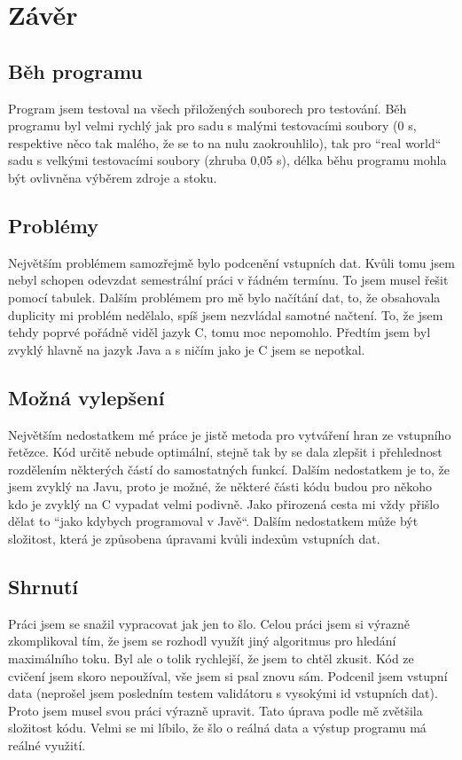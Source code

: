 \documentclass[12pt,a4paper]{article}
\begin{document}
	 \section{Závěr}
	 \subsection{Běh programu}
	 Program jsem testoval na všech přiložených souborech pro testování. Běh programu byl velmi rychlý jak pro sadu s malými testovacími soubory (0 s, respektive něco tak malého, že se to na nulu zaokrouhlilo), tak pro “real world“ sadu s velkými testovacími soubory (zhruba 0,05 s), délka běhu programu mohla být ovlivněna výběrem zdroje a stoku.
	 \subsection{Problémy}
	 Největším problémem samozřejmě bylo podcenění vstupních dat. Kvůli tomu jsem nebyl schopen odevzdat semestrální práci v řádném termínu. To jsem musel řešit pomocí tabulek. Dalším problémem pro mě bylo načítání dat, to, že obsahovala duplicity mi problém nedělalo, spíš jsem nezvládal samotné načtení. To, že jsem tehdy poprvé pořádně viděl jazyk C, tomu moc nepomohlo. Předtím jsem byl zvyklý hlavně na jazyk Java a s ničím jako je C jsem se nepotkal.
	 \subsection{Možná vylepšení}
	 Největším nedostatkem mé práce je jistě metoda pro vytváření hran ze vstupního řetězce. Kód určitě nebude optimální, stejně tak by se dala zlepšit i přehlednost rozdělením některých částí do samostatných funkcí. Dalším nedostatkem je to, že jsem zvyklý na Javu, proto je možné, že některé části kódu budou pro někoho kdo je zvyklý na C vypadat velmi podivně. Jako přirozená cesta mi vždy přišlo dělat to “jako kdybych programoval v Javě“. Dalším nedostatkem může být složitost, která je způsobena úpravami kvůli indexům vstupních dat.
	 \subsection{Shrnutí}
	 Práci jsem se snažil vypracovat jak jen to šlo. Celou práci jsem si výrazně zkomplikoval tím, že jsem se rozhodl využít jiný algoritmus pro hledání maximálního toku. Byl ale o tolik rychlejší, že jsem to chtěl zkusit. Kód ze cvičení jsem skoro nepoužíval, vše jsem si psal znovu sám. Podcenil jsem vstupní data (neprošel jsem posledním testem validátoru s vysokými id vstupních dat). Proto jsem musel svou práci výrazně upravit. Tato úprava podle mě zvětšila složitost kódu. Velmi se mi líbilo, že šlo o reálná data a výstup programu má reálné využití.
\end{document}
